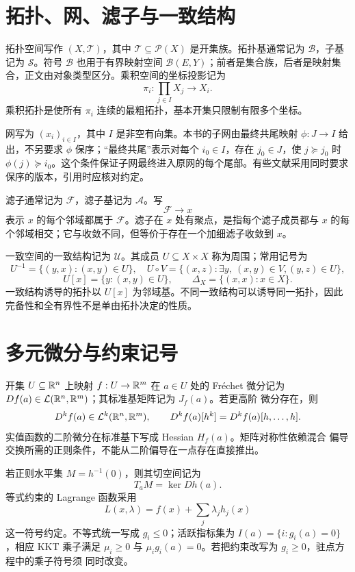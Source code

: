 \section{拓扑、网、滤子与一致结构}

拓扑空间写作 \((X,\mathcal T)\)，其中 \(\mathcal T\subseteq\mathcal P(X)\) 是开集族。拓扑基通常记为 \(\mathcal B\)，子基记为 \(\mathcal S\)。符号 \(\mathcal B\) 也用于有界映射空间 \(\mathcal B(E,Y)\)；前者是集合族，后者是映射集合，正文由对象类型区分。乘积空间的坐标投影记为
\[
 \pi_i:\prod_{j\in I}X_j\longrightarrow X_i.
\]
乘积拓扑是使所有 \(\pi_i\) 连续的最粗拓扑，基本开集只限制有限多个坐标。

网写为 \((x_i)_{i\in I}\)，其中 \(I\) 是非空有向集。本书的子网由最终共尾映射 \(\phi:J\to I\) 给出，不另要求 \(\phi\) 保序；“最终共尾”表示对每个 \(i_0\in I\)，存在 \(j_0\in J\)，使 \(j\succcurlyeq j_0\) 时 \(\phi(j)\succcurlyeq i_0\)。这个条件保证子网最终进入原网的每个尾部。有些文献采用同时要求保序的版本，引用时应核对约定。

滤子通常记为 \(\mathcal F\)，滤子基记为 \(\mathcal A\)。写
\[
 \mathcal F\longrightarrow x
\]
表示 \(x\) 的每个邻域都属于 \(\mathcal F\)。滤子在 \(x\) 处有聚点，是指每个滤子成员都与 \(x\) 的每个邻域相交；它与收敛不同，但等价于存在一个加细滤子收敛到 \(x\)。

一致空间的一致结构记为 \(\mathcal U\)。其成员 \(U\subseteq X\times X\) 称为周围；常用记号为
\[
 U^{-1}=\{(y,x):(x,y)\in U\},
 \quad U\circ V=\{(x,z):\exists y,\ (x,y)\in V,(y,z)\in U\},
\]
\[
 U[x]=\{y:(x,y)\in U\},\qquad
 \Delta_X=\{(x,x):x\in X\}.
\]
一致结构诱导的拓扑以 \(U[x]\) 为邻域基。不同一致结构可以诱导同一拓扑，因此完备性和全有界性不是单由拓扑决定的性质。

\section{多元微分与约束记号}

开集 $U\subseteq\mathbb{R}^n$ 上映射 $f:U\to\mathbb{R}^m$ 在 $a\in U$ 处的 Fréchet 微分记为
$Df(a)\in\mathcal L(\mathbb{R}^n,\mathbb{R}^m)$；其标准基矩阵记为 $J_f(a)$。若更高阶
微分存在，则
\[
 D^kf(a)\in\mathcal L^k(\mathbb{R}^n,\mathbb{R}^m),
 \qquad D^kf(a)[h^k]=D^kf(a)[h,\ldots,h].
\]
实值函数的二阶微分在标准基下写成 Hessian $H_f(a)$。矩阵对称性依赖混合
偏导交换所需的正则条件，不能从二阶偏导在一点存在直接推出。

若正则水平集 $M=h^{-1}(0)$，则其切空间记为
\[
 T_aM=\ker Dh(a).
\]
等式约束的 Lagrange 函数采用
\[
 L(x,\lambda)=f(x)+\sum_j\lambda_jh_j(x)
\]
这一符号约定。不等式统一写成 $g_i\le0$；活跃指标集为
$I(a)=\{i:g_i(a)=0\}$，相应 KKT 乘子满足 $\mu_i\ge0$ 与
$\mu_i g_i(a)=0$。若把约束改写为 $g_i\ge0$，驻点方程中的乘子符号须
同时改变。

